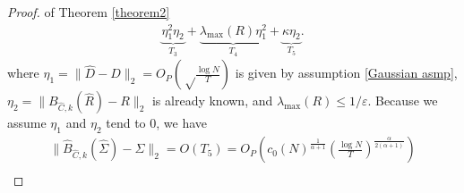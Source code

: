 \begin{proof}{ of Theorem \ref{theorem2}}
\begin{equation}
\begin{split}
                \underbrace{ \eta_1^2 \eta_2 }_{T_3} + 
                \underbrace{ \lambda_{\max}(R) \eta_1^2 }_{T_4} + 
                \underbrace{\kappa \eta_2}_{T_5} .
        \end{split}
        \label{cor2cov 2}
    \end{equation}
    where $\eta_1 =  \lVert \hat D - D \rVert_2 = O_P( \sqrt\frac{\log N}{T} )$ is given by assumption \ref{Gaussian asmp}, $\eta_2 = \lVert B_{\hat C, k}(\hat R) - R \rVert_2$ is already known, and $\lambda_{\max} (R) \leq 1/\varepsilon$. Because we assume $\eta_1$ and $\eta_2$ tend to $0$, we have  
    \begin{equation}
        \begin{split}
            \lVert \hat B_{\hat C, k}(\hat \Sigma) - \Sigma \rVert_2 
                = O( T_5 ) 
            = O_P (  
                c_0(N)^\frac{1}{\alpha+1}  
                ( \frac{\log N}{T} )^\frac{\alpha}{2(\alpha+1)}  ) \\
        \end{split}	
    \end{equation}
\end{proof}

